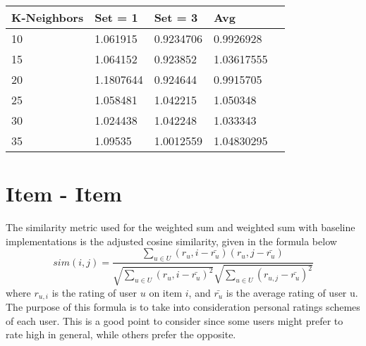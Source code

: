 \documentclass[a4paper]{article}
\begin{document}
\begin{center}
    \begin{tabular}{| l | l | l | l | l |}
    \hline
    K-Neighbors & Set = 1 & Set = 3 & Avg  \\ \hline
    10&1.061915&0.9234706&0.9926928 \\ \hline
    15&1.064152&0.923852&1.03617555 \\ \hline
    20&1.1807644&0.924644&0.9915705 \\ \hline
    25&1.058481&1.042215&1.050348 \\ \hline
    30&1.024438&1.042248&1.033343 \\ \hline
    35&1.09535&1.0012559&1.04830295 \\ \hline
    \hline
    \end{tabular}
\end{center}

\section{Item - Item}
The similarity metric used for the weighted sum and weighted sum with baseline implementations is the adjusted cosine similarity, given in the formula below
$$sim(i, j) = \frac {\sum_{u \in U}(r_u,i - \bar{r_u})(r_u,j - \bar{r_u})}
{\sqrt{\sum_{u \in U}(r_u,i - \bar{r_u})^2 }\sqrt{\sum_{u \in U}(r_{u,j} - \bar{r_u})^2}}$$
where $r_{u,i}$ is the rating of user $u$ on item $i$, and $\bar{r_u}$ is the average rating of user u.\\
The purpose of this formula is to take into consideration personal ratings schemes of each user. This is a good point to consider since some users might prefer to rate high in general, while others prefer the opposite. 
\end{document}
